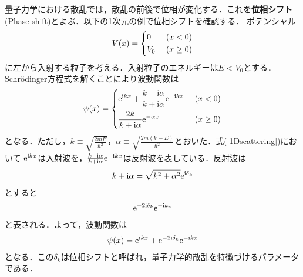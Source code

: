 \documentclass{report}
\begin{document}
  量子力学における散乱では，散乱の前後で位相が変化する．これを\textbf{位相シフト}(Phase shift)とよぶ．以下の1次元の例で位相シフトを確認する．
  ポテンシャル
  \begin{align}
    V(x) = 
    \begin{dcases}
      0\ &(x < 0) \\
      V_0\ &(x \geq 0)
    \end{dcases}
  \end{align}
  に左から入射する粒子を考える．入射粒子のエネルギーは$E<V_0$とする．Schrödinger方程式を解くことにより波動関数は
  \begin{align}
    \psi(x) = 
    \begin{dcases}
      \label{1Dscattering}
      \mathrm{e}^{\mathrm{i} kx} + \frac{k -\mathrm{i}\alpha}{k + \mathrm{i}\alpha} \mathrm{e}^{-\mathrm{i} kx}\ &(x < 0) \\
      \frac{2k}{k + \mathrm{i}\alpha}\mathrm{e}^{-\alpha x}\ &(x \geq 0)
    \end{dcases}
  \end{align}
  となる．ただし，$k \equiv \sqrt{\frac{2mE}{\hbar^2}}，\alpha \equiv \sqrt{\frac{2m(V-E)}{\hbar^2}}$とおいた．式(\ref{1Dscattering})において
  $\mathrm{e}^{\mathrm{i} kx}$は入射波を，$\frac{k -\mathrm{i}\alpha}{k + \mathrm{i}\alpha} \mathrm{e}^{-\mathrm{i} kx}$は反射波を表している．反射波は
  \begin{align}
    k + \mathrm{i}\alpha = \sqrt{k^2 + \alpha^2} \mathrm{e}^{\mathrm{i}\delta_k}
  \end{align}
  とすると
  \begin{align}
    \mathrm{e}^{-2 \mathrm{i} \delta_k}\mathrm{e}^{-\mathrm{i} kx}
  \end{align}
  と表される．よって，波動関数は
  \begin{align}
    \psi(x) = \mathrm{e}^{\mathrm{i} kx} + \mathrm{e}^{-2 \mathrm{i} \delta_k}\mathrm{e}^{-\mathrm{i} kx}
  \end{align}
  となる．この$\delta_k$は位相シフトと呼ばれ，量子力学的散乱を特徴づけるパラメータである．
\end{document}
